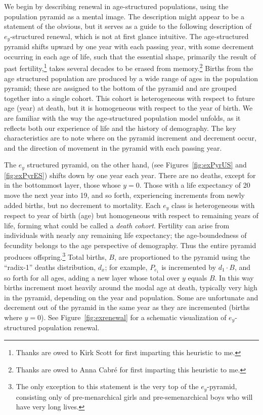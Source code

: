  \FloatBarrier
\label{sec:exrenewal}
We begin by describing renewal in age-structured populations, using the
population pyramid as a mental image. The description might appear to be a
statement of the obvious, but it serves as a guide to the following description of
$e_y$-structured renewal, which is not at first glance intuitive. The
age-structured pyramid shifts upward by one year with each passing year, with 
some decrement occurring in each age of life, such that the essential shape, 
primarily the result of past fertility,\footnote{Thanks are owed to Kirk Scott 
for first imparting this heuristic to me.} takes several decades to be erased 
from memory.\footnote{Thanks are owed to Anna Cabr\'{e} for
first imparting this heuristic to me.} Births from the age structured population 
are produced by a wide range of ages in the population pyramid; these
are assigned to the bottom of the pyramid and are grouped together into a single
cohort. This cohort is heterogeneous with respect to future age (year) at death, 
but it is homogeneous with respect to the year of birth. We are familiar with
the way the age-structured population model unfolds, as it reflects both our
experience of life and the history of demography. The key characteristics are to
note where on the pyramid increment and decrement occur, and the direction of
movement in the pyramid with each passing year.

The $e_y$ structured pyramid, on the other hand, (see Figures~\ref{fig:exPyrUS}
and \ref{fig:exPyrES}) shifts down by one year each year. There are no deaths,
except for in the bottommost layer, those whose $y = 0$. Those with a life
expectancy of 20 move the next year into 19, and so forth, experiencing
increments from newly added births, but no decrement to mortality. 
Each $e_y$ class is heterogeneous with 
respect to year of birth (age) but homogeneous with respect to remaining 
years of life, forming what could be called a \textit{death cohort}. Fertility
can arise from individuals with nearly any remaining life expectancy; the 
age-boundedness of fecundity belongs to the age
perspective of demography. Thus the entire pyramid produces 
offspring.\footnote{The only exception
to this statement is the very top of the $e_y$-pyramid, consisting only of
pre-menarchical girls and pre-semenarchical boys who will have very long
lives.} Total births, $B$, are proportioned to the pyramid using the ``radix-1''
deaths distribution, $d_x$; for example, $P_{e_1}$ is incremented by $d_1 \cdot
B$, and so forth for all ages, adding a new layer whose total over $y$ equals $B$. In 
this way births
increment most heavily around the modal age at death, typically very high in the
pyramid, depending on the year and population. Some are
unfortunate and decrement out of the pyramid in the same year as they are
incremented (births where $y = 0$). See Figure~\ref{fig:exrenewal} for a
schematic visualization of $e_y$-structured population renewal.


